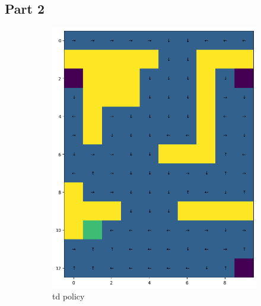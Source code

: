\documentclass{article}
\begin{document}
    \subsection{Part 2}\label{subsec:question-3-2}
    \begin{figure}[h]
        \begin{subfigure} {0.5\textwidth}
            \includegraphics[width=0.9\linewidth]{images/td_policy}
            \caption{td policy}\label{fig:td_policy}
        \end{subfigure}
        \begin{subfigure} {0.5\textwidth}

\end{subfigure}
\end{figure}
\end{document}
